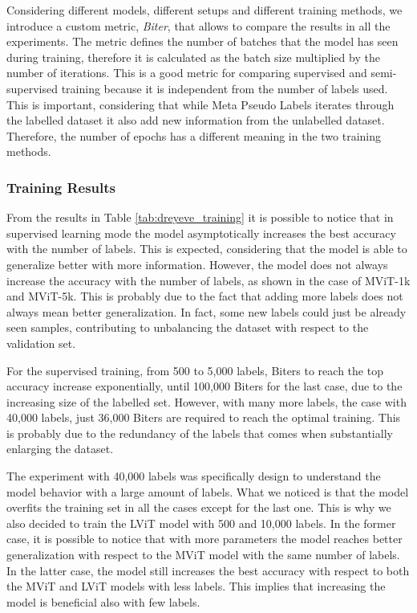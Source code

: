 Considering different models, different setups and different 
training methods, we introduce a custom metric, \emph{Biter}, that allows to 
compare the results in all the experiments. The metric defines the number of 
batches that the model has seen during training, therefore it is calculated as 
the batch size multiplied by the number of iterations. This is a good metric 
for comparing supervised and semi-supervised training because it is independent 
from the number of labels used. This is important, considering that while Meta 
Pseudo Labels iterates through the labelled dataset it also add new information 
from the unlabelled dataset. Therefore, the number of epochs has a different 
meaning in the two training methods.

\subsubsection{Training Results}
From the results in Table \ref{tab:dreyeve_training} it is possible to notice 
that in supervised learning mode the model asymptotically increases the best 
accuracy with the number of labels. This is expected, considering that the 
model is able to generalize better with more information. However, the model 
does not always increase the accuracy with the number of labels, as shown in 
the case of MViT-1k and MViT-5k. This is probably due to the fact that adding 
more labels does not always mean better generalization. In fact, some new labels 
could just be already seen samples, contributing to unbalancing the dataset with 
respect to the validation set. 

For the supervised training, from 500 to 5,000 labels, Biters to reach the top
accuracy increase exponentially, until 100,000 Biters for the last case, 
due to the increasing size of the labelled set.
However, with many more labels, the case with 40,000 labels, just 36,000 Biters 
are required to reach the optimal training. This is probably due to the redundancy 
of the labels that comes when substantially enlarging the dataset.


The experiment with 40,000 labels was specifically design to understand the model 
behavior with a large amount of labels. What we noticed is that the model 
overfits the training set in all the cases except for the last one. This is 
why we also decided to train the LViT model with 500 and 10,000 labels.
In the former case, it is possible to notice that with more parameters the model 
reaches better generalization with respect to the MViT model with the same number 
of labels. In the latter case, the model still increases the best accuracy with 
respect to both the MViT and LViT models with less labels. This implies that 
increasing the model is beneficial also with few labels.

